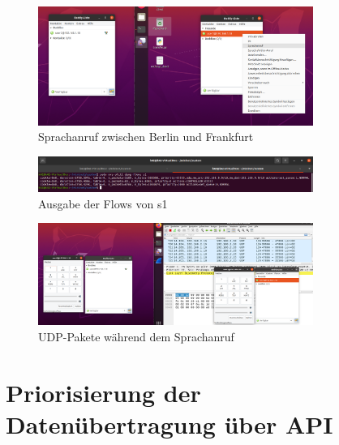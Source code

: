 \documentclass[fontsize=12pt,paper=a4,open=any,parskip=half,
  twoside=false,toc=listof,toc=bibliography,fleqn,leqno,
  captions=nooneline,captions=tableabove,british]{scrbook}
\begin{document}
\begin{figure}[H]
 \centering
 \includegraphics[width=0.8\textwidth]{Bilder/pidgin}
 \captionsetup{justification=centering}
 \caption{Sprachanruf zwischen Berlin und Frankfurt}
 \label{pidgin}
\end{figure}

\begin{figure}[H]
 \centering
 \includegraphics[width=0.8\textwidth]{Bilder/udp}
 \captionsetup{justification=centering}
 \caption{Ausgabe der Flows von s1}
 \label{udp}
\end{figure}

\begin{figure}[H]
 \centering
 \includegraphics[width=0.8\textwidth]{Bilder/udp2}
 \captionsetup{justification=centering}
 \caption{UDP-Pakete während dem Sprachanruf}
 \label{udp2}
\end{figure}

\section{Priorisierung der Datenübertragung über API}
\end{document}
